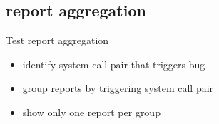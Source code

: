 \subsection{report aggregation}
\begin{frame}{Test report aggregation}{~}
\begin{itemize}
    \setlength\itemsep{1em}
    \item identify system call pair that triggers bug
    \item group reports by triggering system call pair
    \item show only one report per group
\end{itemize}


\end{frame}